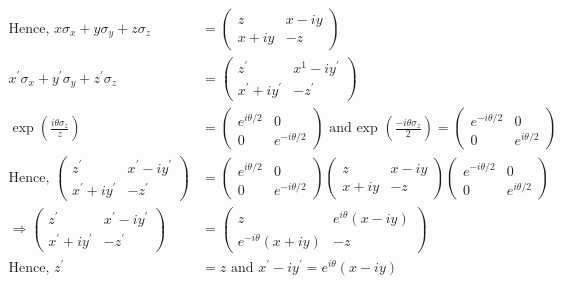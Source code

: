 \begin{enumerate}[label=\color{ocre}\textbf{\arabic*.}]
\begin{answer}
\begin{align*}
		\text{Hence, }x \sigma_{x}+y \sigma_{y}+z \sigma_{z}&=\left(\begin{array}{cc}z & x-i y \\ x+i y & -z\end{array}\right)\\
		x^{\prime} \sigma_{x}+y^{\prime} \sigma_{y}+z^{\prime} \sigma_{z}&=\left(\begin{array}{cc}z^{\prime} & x^{1}-i y^{\prime} \\ x^{\prime}+i y^{\prime} & -z^{\prime}\end{array}\right)\\
		\exp \left(\frac{i \theta \sigma_{z}}{z}\right)&=\left(\begin{array}{cc}e^{i \theta / 2} & 0 \\ 0 & e^{-i \theta / 2}\end{array}\right)\text{ and exp }\left(\frac{-i \theta \sigma_{z}}{2}\right)=\left(\begin{array}{cc}e^{-i \theta / 2} & 0 \\ 0 & e^{i \theta / 2}\end{array}\right)\\
		\text{Hence, }\left(\begin{array}{cc}z^{\prime} & x^{\prime}-i y^{\prime} \\ x^{\prime}+i y^{\prime} & -z^{\prime}\end{array}\right)&=\left(\begin{array}{cc}e^{i \theta / 2} & 0 \\ 0 & e^{-i \theta / 2}\end{array}\right)\left(\begin{array}{cc}z & x-i y \\ x+i y & -z\end{array}\right)\left(\begin{array}{cc}e^{-i \theta / 2} & 0 \\ 0 & e^{i \theta / 2}\end{array}\right)\\
		\Rightarrow\left(\begin{array}{cc}z^{\prime} & x^{\prime}-i y^{\prime} \\ x^{\prime}+i y^{\prime} & -z^{\prime}\end{array}\right)&=\left(\begin{array}{cc}z & e^{i \theta}(x-i y) \\ e^{-i \theta}(x+i y) & -z\end{array}\right)\\
		\text{Hence, }z^{\prime}&=z\text{ and }x^{\prime}-i y^{\prime}=e^{i \theta}(x-i y)\\

\end{align*}
\end{answer}
\end{enumerate}
